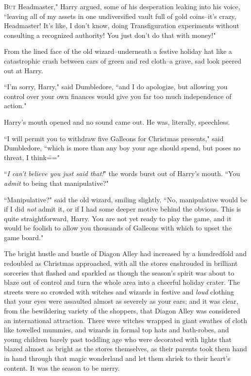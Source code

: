 
\lettrine[ante=``]{B}{ut} Headmaster," Harry argued, some of his desperation leaking into his voice, ``leaving all of my assets in one undiversified vault full of gold coins\---it's crazy, Headmaster! It's like, I don't know, doing Transfiguration experiments without consulting a recognized authority! You just don't do that with money!"

From the lined face of the old wizard\---underneath a festive holiday hat like a catastrophic crash between cars of green and red cloth\---a grave, sad look peered out at Harry.

``I'm sorry, Harry," said Dumbledore, ``and I do apologize, but allowing you control over your own finances would give you far too much independence of action."

Harry's mouth opened and no sound came out. He was, literally, speechless.

``I will permit you to withdraw five Galleons for Christmas presents," said Dumbledore, ``which is more than any boy your age should spend, but poses no threat, I think\==="

``\emph{I can't believe you just said that!}" the words burst out of Harry's mouth. ``You \emph{admit} to being that manipulative?"

``Manipulative?" said the old wizard, smiling slightly. ``No, manipulative would be if I did \emph{not} admit it, or if I had some deeper motive behind the obvious. This is quite straightforward, Harry. You are not yet ready to play the game, and it would be foolish to allow you thousands of Galleons with which to upset the game board."

\later

The bright hustle and bustle of Diagon Alley had increased by a hundredfold and redoubled as Christmas approached, with all the stores enshrouded in brilliant sorceries that flashed and sparkled as though the season's spirit was about to blaze out of control and turn the whole area into a cheerful holiday crater. The streets were so crowded with witches and wizards in festive and \emph{loud} clothing that your eyes were assaulted almost as severely as your ears; and it was clear, from the bewildering variety of the shoppers, that Diagon Alley was considered an international attraction. There were witches wrapped in giant swathes of cloth like towelled mummies, and wizards in formal top hats and bath-robes, and young children barely past toddling age who were decorated with lights that blazed almost as bright as the stores themselves, as their parents took them hand in hand through that magic wonderland and let them shriek to their heart's content. It was the season to be merry.


